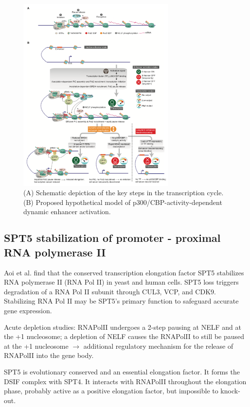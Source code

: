 \begin{figure}
\centering
\includegraphics[width=0.7\textwidth]{../_resources/Screenshot_2022-12-19_at_16-39-14.png}
\caption{(A) Schematic depiction of the key steps in the transcription cycle.
(B) Proposed hypothetical model of p300/CBP-activity-dependent dynamic enhancer activation. }
\end{figure}

\subsection{SPT5 stabilization of promoter - proximal RNA polymerase II}
Aoi et al. find that the conserved transcription elongation factor SPT5 stabilizes RNA polymerase II (RNA Pol II) in yeast and human cells. SPT5 loss triggers degradation of a RNA Pol II subunit through CUL3, VCP, and CDK9. Stabilizing RNA Pol II may be SPT5’s primary function to safeguard accurate gene expression.

Acute depletion studies: RNAPolII undergoes a 2-step pausing at NELF and at the +1 nucleosome; a depletion of NELF causes the RNAPolII to still be paused at the +1 nucleosome $\rightarrow$ additional regulatory mechanism for the release of RNAPolII into the gene body.

SPT5 is evolutionary conserved and an essential elongation factor. It forms the DSIF complex with SPT4. It interacts with RNAPolII throughout the elongation phase, probably active as a positive elongation factor, but impossible to knock-out.

